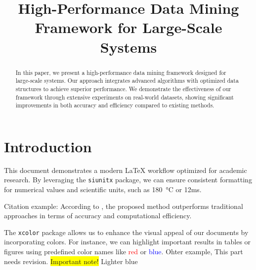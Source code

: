 \documentclass[11pt, a4paper]{article}
\title{High-Performance Data Mining Framework for Large-Scale Systems}
\date{}
\begin{document}
\maketitle
\thispagestyle{fancy}

\begin{abstract}
	In this paper, we present a high-performance data mining framework designed for large-scale systems. Our approach integrates advanced algorithms with optimized data structures to achieve superior performance. We demonstrate the effectiveness of our framework through extensive experiments on real-world datasets, showing significant improvements in both accuracy and efficiency compared to existing methods.
\end{abstract}

\section{Introduction}
This document demonstrates a modern LaTeX workflow optimized for academic research. By leveraging the \texttt{siunitx} package, we can ensure consistent formatting for numerical values and scientific units, such as \qty{180}{\celsius} or \unit{12}{ms}.

Citation example: According to \cite{Wu2024Systems,Wu2025ICDM}, the proposed method outperforms traditional approaches in terms of accuracy and computational efficiency.


The \texttt{xcolor} package allows us to enhance the visual appeal of our documents by incorporating colors. For instance, we can highlight important results in tables or figures using predefined color names like \textcolor{red}{red} or \textcolor{blue}{blue}.
Ohter example, {\color{red} This part needs revision.} \colorbox{yellow}{Important note!}  {\color{blue!60!white} Lighter blue}
\end{document}
